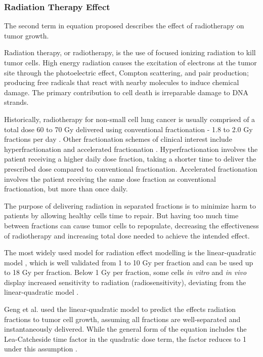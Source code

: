 \documentclass[letterpaper
, superscriptaddress
, twocolumn
, aps
]{revtex4}
\begin{document}
\subsubsection{Radiation Therapy Effect}
The second term in equation proposed describes the effect of radiotherapy on tumor growth.

Radiation therapy, or radiotherapy, is the use of focused ionizing radiation to kill tumor cells. High energy radiation causes the excitation of electrons at the tumor site through the photoelectric effect, Compton scattering, and pair production; producing free radicals that react with nearby molecules to induce chemical damage. The primary contribution to cell death is irreparable damage to DNA strands.

Historically, radiotherapy for non-small cell lung cancer is usually comprised of a total dose 60 to 70 Gy delivered using conventional fractionation - 1.8 to 2.0 Gy fractions per day \cite{PDQATEB2020}. Other fractionation schemes of clinical interest include hyperfractionation and accelerated fractionation \cite{Geng2017, PDQATEB2020}. Hyperfractionation involves the patient receiving a higher daily dose fraction, taking a shorter time to deliver the prescribed dose compared to conventional fractionation. Accelerated fractionation involves the patient receiving the same dose fraction as conventional fractionation, but more than once daily. 

The purpose of delivering radiation in separated fractions is to minimize harm to patients by allowing healthy cells time to repair. But having too much time between fractions can cause tumor cells to repopulate, decreasing the effectiveness of radiotherapy and increasing total dose needed to achieve the intended effect.
 
The most widely used model for radiation effect modelling is the linear-quadratic model \cite{Geng2017, Grassberger2016, Mayles2008, Brenner2008}, which is well validated from 1 to 10 Gy per fraction and can be used up to 18 Gy per fraction\cite{Brenner2008}. Below 1 Gy per fraction, some cells \textit{in vitro} and \textit{in vivo} display increased sensitivity to radiation (radiosensitivity), deviating from the linear-quadratic model \cite{Mayles2008}. 

Geng et al. used the linear-quadratic model to predict the effects radiation fractions to tumor cell growth, assuming all fractions are well-separated and instantaneously delivered. While the general form of the equation includes the Lea-Catcheside time factor in the quadratic dose term, the factor reduces to 1 under this assumption \cite{Brenner2008, Grassberger2016}.   
\end{document}
